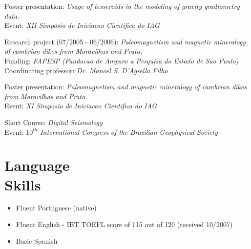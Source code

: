 \documentclass[margin,line]{resume}
\begin{document}
\begin{resume}
\begin{list1}
		\item[] Poster presentation: \textit{Usage of tesseroids in the modeling of gravity gradiometry data.}\\ 
                        Event: \textit{XII Simposio de Iniciacao Cientifica do IAG}\\

		\item[] Research project (07/2005 - 06/2006): \textit{Paleomagnetism and magnetic mineralogy of cambrian dikes from Maravilhas and Prata.}\\
						Funding: \textit{FAPESP (Fundacao de Amparo a Pesquisa do Estado de Sao Paulo)}\\
						Coordinating professor: \textit{Dr. Manoel S. D'Agrella Filho}\\

		\item[] Poster presentation: \textit{Paleomagnetism and magnetic mineralogy of cambrian dikes from Maravilhas and Prata.}\\ 
						Event: \textit{XI Simposio de Iniciacao Cientifica do IAG}\\        

		\item[] Short Course: \textit{Digital Seismology}\\
						Event: \textit{$10^{th}$ International Congress of the Brazilian Geophysical Society }

		\end{list1}
		
		
		
		\section{\mysidestyle Language\\Skills}
		
		\begin{itemize}
			\item Fluent Portuguese (native)
			\item Fluent English - IBT TOEFL score of 115 out of 120 (received 10/2007)
			\item Basic Spanish			
		\end{itemize}



\end{resume}
\end{document}
